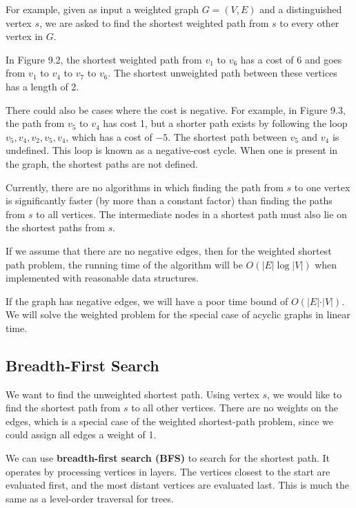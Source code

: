 For example, given as input a weighted graph \(G = (V, E)\) and a distinguished vertex \(s\), we are asked to find the shortest weighted path from \(s\) to every other vertex in \(G\).

In Figure 9.2, the shortest weighted path from \(v_1\) to \(v_6\) has a cost of 6 and goes from \(v_1\) to \(v_4\) to \(v_7\) to \(v_6\). The shortest unweighted path between these vertices has a length of 2. 

There could also be cases where the cost is negative. For example, in Figure 9.3, the path from \(v_5\) to \(v_4\) has cost 1, but a shorter path exists by following the loop \(v_5, v_4, v_2, v_5, v_4\), which has a cost of \(-5\). The shortest path between \(v_5\) and \(v_4\) is undefined. This loop is known as a negative-cost cycle. When one is present in the graph, the shortest paths are not defined.

Currently, there are no algorithms in which finding the path from \(s\) to one vertex is significantly faster (by more than a constant factor) than finding the paths from \(s\) to all vertices. The intermediate nodes in a shortest path must also lie on the shortest paths from \(s\).

If we assume that there are no negative edges, then for the weighted shortest path problem, the running time of the algorithm will be \(O(\vert E \vert \log \vert V \vert)\) when implemented with reasonable data structures.

If the graph has negative edges, we will have a poor time bound of \(O(\vert E \vert \cdot \vert V \vert)\). We will solve the weighted problem for the special case of acyclic graphs in linear time.

\subsection{Breadth-First Search}
We want to find the unweighted shortest path. Using vertex \(s\), we would like to find the shortest path from \(s\) to all other vertices. There are no weights on the edges, which is a special case of the weighted shortest-path problem, since we could assign all edges a weight of 1. 

We can use \textbf{breadth-first search (BFS)} to search for the shortest path. It operates by processing vertices in layers. The vertices closest to the start are evaluated first, and the most distant vertices are evaluated last. This is much the same as a level-order traversal for trees.



